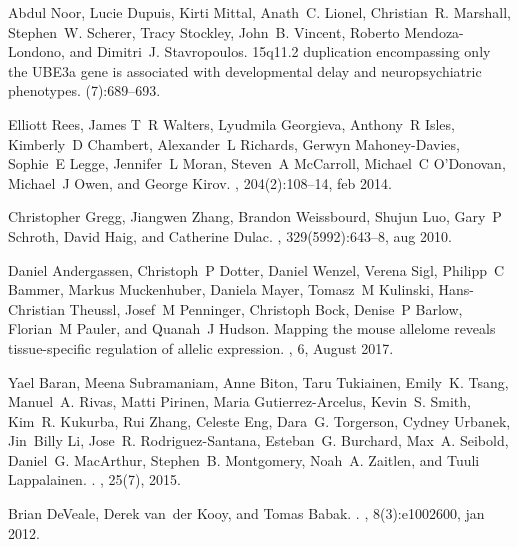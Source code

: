 \documentclass[letterpaper]{article}
\begin{document}
%
\begin{thebibliography}{10}

Abdul Noor, Lucie Dupuis, Kirti Mittal, Anath~C. Lionel, Christian~R. Marshall,
  Stephen~W. Scherer, Tracy Stockley, John~B. Vincent, Roberto Mendoza-Londono,
  and Dimitri~J. Stavropoulos.
\newblock 15q11.2 duplication encompassing only the {UBE}3a gene is associated
  with developmental delay and neuropsychiatric phenotypes.
(7):689--693.

Elliott Rees, James T~R Walters, Lyudmila Georgieva, Anthony~R Isles,
  Kimberly~D Chambert, Alexander~L Richards, Gerwyn Mahoney-Davies, Sophie~E
  Legge, Jennifer~L Moran, Steven~A McCarroll, Michael~C O'Donovan, Michael~J
  Owen, and George Kirov.
, 204(2):108--14, feb 2014.

Christopher Gregg, Jiangwen Zhang, Brandon Weissbourd, Shujun Luo, Gary~P
  Schroth, David Haig, and Catherine Dulac.
, 329(5992):643--8, aug 2010.

Daniel Andergassen, Christoph~P Dotter, Daniel Wenzel, Verena Sigl, Philipp~C
  Bammer, Markus Muckenhuber, Daniela Mayer, Tomasz~M Kulinski, Hans-Christian
  Theussl, Josef~M Penninger, Christoph Bock, Denise~P Barlow, Florian~M
  Pauler, and Quanah~J Hudson.
\newblock Mapping the mouse allelome reveals tissue-specific regulation of
  allelic expression.
, 6, August 2017.

Yael Baran, Meena Subramaniam, Anne Biton, Taru Tukiainen, Emily~K. Tsang,
  Manuel~A. Rivas, Matti Pirinen, Maria Gutierrez-Arcelus, Kevin~S. Smith,
  Kim~R. Kukurba, Rui Zhang, Celeste Eng, Dara~G. Torgerson, Cydney Urbanek,
  Jin~Billy Li, Jose~R. Rodriguez-Santana, Esteban~G. Burchard, Max~A. Seibold,
  Daniel~G. MacArthur, Stephen~B. Montgomery, Noah~A. Zaitlen, and Tuuli
  Lappalainen.
.
, 25(7), 2015.

Brian DeVeale, Derek van~der Kooy, and Tomas Babak.
.
, 8(3):e1002600, jan 2012.


\end{thebibliography}
\end{document}

